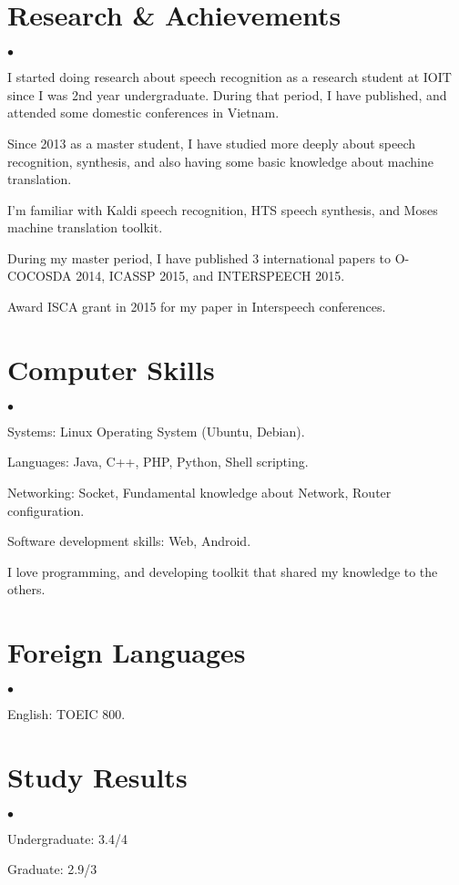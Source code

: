 \documentclass[margin,line]{res}
\newenvironment{list2}{
  \begin{list}{$\bullet$}{%
      \setlength{\itemsep}{0in}
      \setlength{\parsep}{0in} \setlength{\parskip}{0in}
      \setlength{\topsep}{0in} \setlength{\partopsep}{0in} 
      \setlength{\leftmargin}{0.2in}}}{\end{list}}
\begin{document}
\begin{resume}
\section{\sc Research \& Achievements}
\begin{list2}
\item I started doing research about speech recognition as a research student at IOIT since I was 2nd year undergraduate. During that period, I have published, and attended some domestic conferences in Vietnam.
\item Since 2013 as a master student, I have studied more deeply about speech recognition, synthesis, and also having some basic knowledge about machine translation.
\item I'm familiar with Kaldi speech recognition, HTS speech synthesis, and Moses machine translation toolkit.
\item During my master period, I have published 3 international papers to O-COCOSDA 2014, ICASSP 2015, and INTERSPEECH 2015.
\item Award ISCA grant in 2015 for my paper in Interspeech conferences.
\end{list2}

\section{\sc Computer Skills }
\begin{list2}
\item Systems: Linux Operating System (Ubuntu, Debian).
\item Languages: Java, C++, PHP, Python, Shell scripting.
\item Networking: Socket, Fundamental knowledge about Network, Router configuration.
\item Software development skills: Web, Android.
\item I love programming, and developing toolkit that shared my knowledge to the others.
\end{list2}
\section{\sc Foreign Languages}
\begin{list2}
\item English: TOEIC 800.
\end{list2}
\section{\sc Study Results}
\begin{list2}
\item Undergraduate: 3.4/4
\item Graduate: 2.9/3
\end{list2}


\end{resume}
\end{document}
